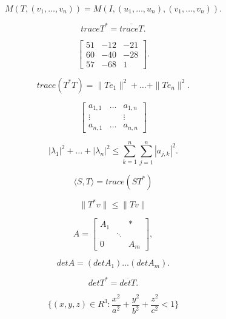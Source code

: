 \documentclass[a4paper, 12pt, twoside]{book}
\begin{document}
\[
	M(T, (v_1,\dots,v_n)) = M(I,(u_1,\dots,u_n), (v_1,\dots,v_n)).
\]

\[
	trace T^* = \overline{trace T}.
\]

\[
	\begin{bmatrix} 51 & -12 & -21 \\ 60 & -40 & -28 \\ 57 & -68 & 1 \end{bmatrix}.
\]

\[
	trace(T^*T) = \| Te_1\|^2 + \dots + \|Te_n\|^2.
\]

\[
	\begin{bmatrix}a_{1,1} & \dots  & a_{1,n} \\\vdots & &\vdots \\a_{n,1} & \dots  & a_{n,n}\end{bmatrix}
\]

\[
	|\lambda_1|^2 + \dots + |\lambda_n|^2 \le \sum_{k=1}^n \sum_{j=1}^n |a_{j,k}|^2.
\]

\[
	\langle S,T \rangle = trace(ST^*)
\]

\[
	\|T^*v\| \le \|Tv\|
\]

\[
	A = \begin{bmatrix}A_1 &   & * \\ \ & \ddots &  \\ 0 &   & A_m\end{bmatrix},
\]

\[
	det A = (det A_1)\dots(det A_m).
\]

\[
	det T^* = \overline{det T}.
\]

\[
	\{ (x,y,z) \in R^3 : \frac{x^2}{a^2} + \frac{y^2}{b^2} + \frac{z^2}{c^2} < 1 \}
\]
\end{document}
